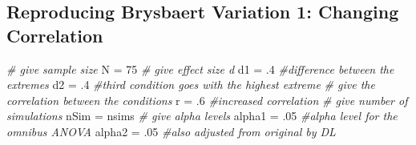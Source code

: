 \documentclass[]{book}
\newenvironment{Shaded}{\begin{snugshade}}{\end{snugshade}}
\newcommand{\CommentTok}[1]{\textcolor[rgb]{0.56,0.35,0.01}{\textit{#1}}}
\newcommand{\DecValTok}[1]{\textcolor[rgb]{0.00,0.00,0.81}{#1}}
\newcommand{\FloatTok}[1]{\textcolor[rgb]{0.00,0.00,0.81}{#1}}
\newcommand{\NormalTok}[1]{#1}
\newcommand{\StringTok}[1]{\textcolor[rgb]{0.31,0.60,0.02}{#1}}
\begin{document}
\hypertarget{reproducing-brysbaert-variation-1-changing-correlation}{%
\subsection{Reproducing Brysbaert Variation 1: Changing Correlation}\label{reproducing-brysbaert-variation-1-changing-correlation}}

\begin{Shaded}
\begin{Highlighting}[]
\CommentTok{# give sample size}
\NormalTok{N =}\StringTok{ }\DecValTok{75}
\CommentTok{# give effect size d}
\NormalTok{d1 =}\StringTok{ }\FloatTok{.4} \CommentTok{#difference between the extremes}
\NormalTok{d2 =}\StringTok{ }\FloatTok{.4} \CommentTok{#third condition goes with the highest extreme}
\CommentTok{# give the correlation between the conditions}
\NormalTok{r =}\StringTok{ }\FloatTok{.6} \CommentTok{#increased correlation}
\CommentTok{# give number of simulations}
\NormalTok{nSim =}\StringTok{ }\NormalTok{nsims}
\CommentTok{# give alpha levels}
\NormalTok{alpha1 =}\StringTok{ }\FloatTok{.05} \CommentTok{#alpha level for the omnibus ANOVA}
\NormalTok{alpha2 =}\StringTok{ }\FloatTok{.05} \CommentTok{#also adjusted from original by DL}
\end{Highlighting}
\end{Shaded}
\end{document}
